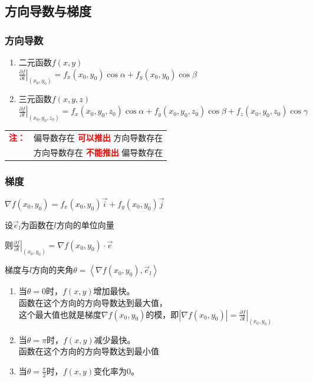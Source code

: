 \documentclass{article} %
\begin{document}
\subsection{方向导数与梯度}
\subsubsection{方向导数}
\begin{enumerate}
    \item 二元函数$f(x,y)$\\
        $\displaystyle 
        \left.\frac{\partial f}{\partial l}\right|_{(x_0,y_0)}
        =f_x(x_0,y_0)\cos\alpha+f_y(x_0,y_0)\cos\beta$

    \item 三元函数$f(x,y,z)$\\
        $\displaystyle 
        \left.\frac{\partial f}{\partial l}\right|_{(x_0,y_0,z_0)}
        =f_x(x_0,y_0,z_0)\cos\alpha+f_y(x_0,y_0,z_0)\cos\beta+f_z(x_0,y_0,z_0)\cos\gamma$
\end{enumerate}

\begin{tabular}{ll}
    \textcolor{red}{\textbf{注：}} & 偏导数存在 \textcolor{red}{\textbf{可以推出}} 方向导数存在\\
    & 方向导数存在 \textcolor{red}{\textbf{不能推出}} 偏导数存在
\end{tabular}


\subsubsection{梯度}
$\nabla f(x_0,y_0)=f_x(x_0,y_0)\vec{i}+f_y(x_0,y_0)\vec{j}$\vspace{5mm}\par
设$\vec{e}_l$为函数在$l$方向的单位向量\vspace{1mm}\par
则$\displaystyle\left.\frac{\partial f}{\partial l}\right|_{(x_0,y_0)}=\nabla f(x_0,y_0)\cdot\vec{e}$\vspace{1mm}\par
梯度与$l$方向的夹角$\theta=\left\langle \nabla f(x_0,y_0),\vec{e}_l \right\rangle  $
\begin{enumerate}
    \item 当$\theta=0$时，$f(x,y)$增加最快。\\
        函数在这个方向的方向导数达到最大值，\\
        这个最大值也就是梯度$\nabla f(x_0,y_0)$的模，即$\displaystyle |\nabla f(x_0,y_0)|=\left.\frac{\partial f}{\partial l}\right|_{(x_0,y_0)}$
    \item 当$\theta=\pi$时，$f(x,y)$减少最快。\\
        函数在这个方向的方向导数达到最小值
    \item 当$\theta=\frac{\pi}{2}$时，$f(x,y)$变化率为0。\\
    
\end{enumerate}
\end{document}
